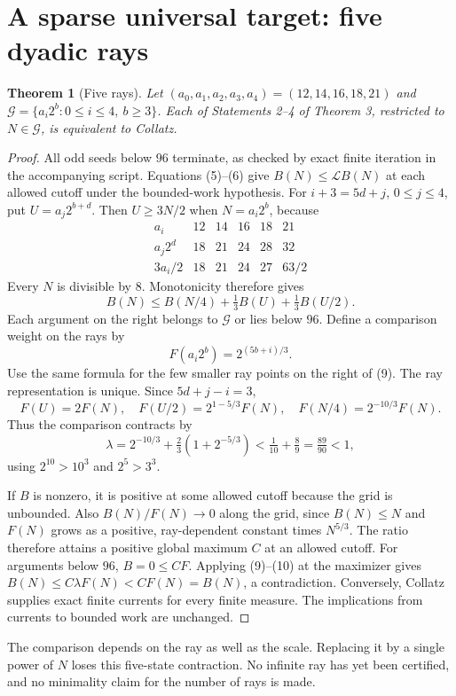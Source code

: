\documentclass[11pt]{article}
\newtheorem{theorem}{Theorem}
\newcommand{\Lip}{\mathcal L}
\begin{document}
\section{A sparse universal target: five dyadic rays}
\begin{theorem}[Five rays]\label{thm:rays}
Let $(a_0,a_1,a_2,a_3,a_4)=(12,14,16,18,21)$ and
$\mathcal G=\{a_i2^b:0\le i\le4,\ b\ge3\}$.
Each of Statements 2--4 of Theorem 3, restricted to $N\in\mathcal G$,
is equivalent to Collatz.
\end{theorem}
\begin{proof}
All odd seeds below $96$ terminate, as checked by exact finite iteration
in the accompanying script. Equations (5)--(6) give
$B(N)\le\Lip B(N)$ at each allowed cutoff under the bounded-work hypothesis.
For $i+3=5d+j$, $0\le j\le4$, put
$U=a_j2^{b+d}$. Then $U\ge3N/2$ when $N=a_i2^b$, because
\[
\begin{array}{c|rrrrr}
a_i&12&14&16&18&21\\\hline
a_j2^d&18&21&24&28&32\\
3a_i/2&18&21&24&27&63/2
\end{array}
\]
Every $N$ is divisible by $8$. Monotonicity therefore gives
\[
B(N)\le B(N/4)+\tfrac13B(U)+\tfrac13B(U/2).                 \tag{9}
\]
Each argument on the right belongs to $\mathcal G$ or lies below $96$.
Define a comparison weight on the rays by
\[
F(a_i2^b)=2^{(5b+i)/3}.
\]
Use the same formula for the few smaller ray points on the right of (9).
The ray representation is unique. Since $5d+j-i=3$,
\[
F(U)=2F(N),\quad F(U/2)=2^{1-5/3}F(N),\quad
F(N/4)=2^{-10/3}F(N).
\]
Thus the comparison contracts by
\[
\lambda=2^{-10/3}+\tfrac23(1+2^{-5/3})
<\tfrac1{10}+\tfrac89=\tfrac{89}{90}<1,                     \tag{10}
\]
using $2^{10}>10^3$ and $2^5>3^3$.

If $B$ is nonzero, it is positive at some allowed cutoff because the grid
is unbounded. Also $B(N)/F(N)\to0$ along the grid, since
$B(N)\le N$ and $F(N)$ grows as a positive, ray-dependent constant times
$N^{5/3}$. The ratio therefore attains a positive global maximum $C$ at
an allowed cutoff. For arguments below $96$, $B=0\le CF$.
Applying (9)--(10) at the maximizer gives
$B(N)\le C\lambda F(N)<CF(N)=B(N)$, a contradiction.
Conversely, Collatz supplies exact finite currents for every finite measure.
The implications from currents to bounded work are unchanged.
\end{proof}
The comparison depends on the ray as well as the scale. Replacing it by a
single power of $N$ loses this five-state contraction. No infinite ray has
yet been certified, and no minimality claim for the number of rays is made.
\end{document}
